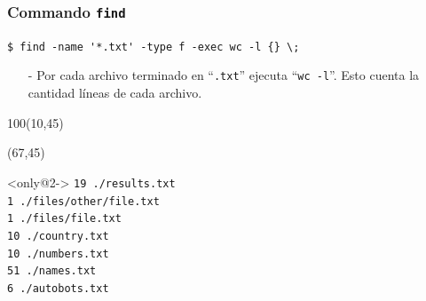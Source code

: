 \documentclass{beamer}
\begin{document}
\begin{frame}[fragile,t]
    \frametitle{Commando \texttt{find}}
    \begin{block}{\vspace*{-3ex}}
    \texttt{\$}\verb: find -name '*.txt' -type f -exec wc -l {} \;:
    \vspace*{0.5ex}
    \end{block}
    \begin{itemize}
    \item[-] Por cada archivo terminado en ``\verb|.txt|'' ejecuta ``\verb|wc -l|''. Esto cuenta la cantidad líneas de cada archivo.
    \end{itemize}
    \begin{textblock}{100}(10,45)
    \begin{center}
    \end{center}
    \end{textblock}
    \begin{textblock}{50}(67,45)
     \vspace{-0.5cm}
    \begin{block}<only@2->{\vspace*{-3ex}}
    \small
    \verb:19 ./results.txt:\\
    \verb:1 ./files/other/file.txt:\\
    \verb:1 ./files/file.txt:\\
    \verb:10 ./country.txt:\\
    \verb:10 ./numbers.txt:\\
    \verb:51 ./names.txt:\\
    \verb:6 ./autobots.txt:
    \vspace*{0.5ex}
    \end{block}
    \end{textblock}
\end{frame}
\end{document}
